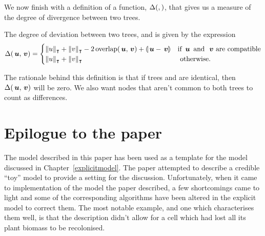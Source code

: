 \begin{definition}



\end{definition}


We now finish with a definition of a function, $\Delta(,)$, that gives us a
measure of the degree of divergence between two trees.
\begin{definition}\label{defdeviation}
  The degree of deviation between two trees,  and  is given  by the expression
  \begin{equation}
    \Delta(\,\boldsymbol{u},\,\boldsymbol{v}) = \begin{cases}
      \lVert{u}\rVert_{\intercal} + \lVert{v}\rVert_{\intercal} - 2\operatorname{overlap}(\,\boldsymbol{u},\,\boldsymbol{v}) + \llparenthesis{\,\boldsymbol{u} - \,\boldsymbol{v}}\rrparenthesis&\text{if }\,\boldsymbol{u} \operatorname{\text{~and~}} \,\boldsymbol{v} \text{ are compatible} \\
      \lVert{u}\rVert_{\intercal} + \lVert{v}\rVert_{\intercal} & \text{ otherwise.}
    \end{cases}
  \end{equation}
  
  The rationale behind this definition is that if trees  and  are identical, then
  $\Delta(\,\boldsymbol{u},\,\boldsymbol{v})$ will be zero. We also want nodes that aren't common to both trees to
  count as differences.
\end{definition}

\section{Epilogue to the paper}

The model described in this paper has been used as a template for the
model discussed in Chapter~\ref{explicitmodel}. The paper attempted to
describe a credible ``toy'' model to provide a setting for the
discussion. Unfortunately, when it came to implementation of the model
the paper described, a few shortcomings came to light and some of the
corresponding algorithms have been altered in the explicit
model to correct them.  The most notable example, and one which
characterises them well, is that the description didn't allow for a
cell which had lost all its plant biomass to be recolonised.

